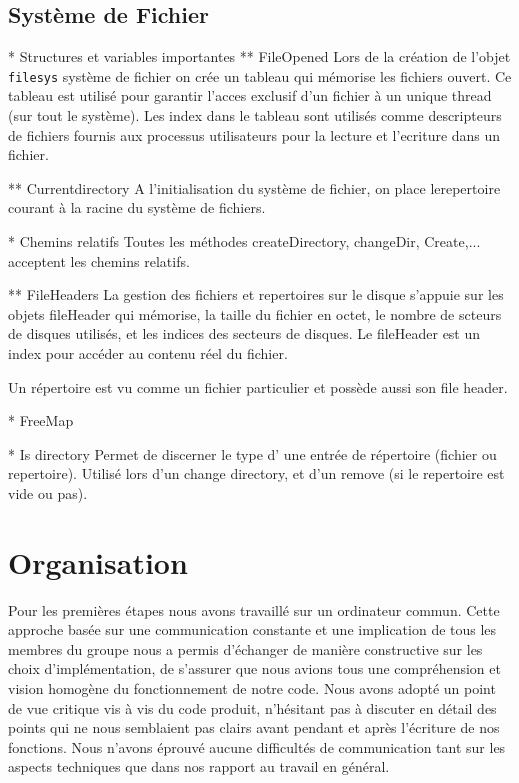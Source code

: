 \documentclass[11pt]{article}
\begin{document}
\subsection{Système de Fichier}


* Structures et variables importantes 
** FileOpened 
Lors de la création de l'objet \texttt{filesys} système de fichier on crée un tableau qui mémorise les fichiers ouvert. Ce tableau est utilisé pour garantir l'acces exclusif d'un fichier à un unique thread (sur tout le système). Les index dans le tableau sont utilisés comme descripteurs de fichiers fournis aux processus utilisateurs pour la lecture et l'ecriture dans un fichier.


** Currentdirectory
A l'initialisation du système de fichier, on place lerepertoire courant à la racine du système de fichiers.

* Chemins relatifs
Toutes les méthodes createDirectory, changeDir, Create,... acceptent les chemins relatifs.

** FileHeaders
La gestion des fichiers et repertoires sur le disque s'appuie sur les objets fileHeader qui mémorise,
la taille du fichier en octet, le nombre de scteurs de disques utilisés, et les indices des secteurs de disques.
Le fileHeader est un index pour accéder au contenu réel du fichier.


Un répertoire est vu comme un fichier particulier et possède aussi son file header.
 
* FreeMap

* Is directory
Permet de discerner le type d' une entrée de répertoire (fichier ou repertoire).
Utilisé lors d'un change directory, et d'un remove (si le repertoire est vide ou pas).
 

\section{Organisation}
Pour les premières étapes nous avons travaillé sur un ordinateur commun.
Cette approche basée sur une communication constante et une implication de tous les membres du groupe
nous a permis d'échanger de manière constructive sur les choix d'implémentation, de s'assurer que
nous avions tous une compréhension et vision homogène du fonctionnement de notre code. Nous
avons adopté un point de vue critique vis à vis du code produit,
n'hésitant pas à discuter en détail des points qui ne nous semblaient pas clairs
avant pendant et après l'écriture de nos fonctions. Nous n'avons éprouvé aucune difficultés de communication
tant sur les aspects techniques que dans nos rapport au travail en général.
\end{document}
